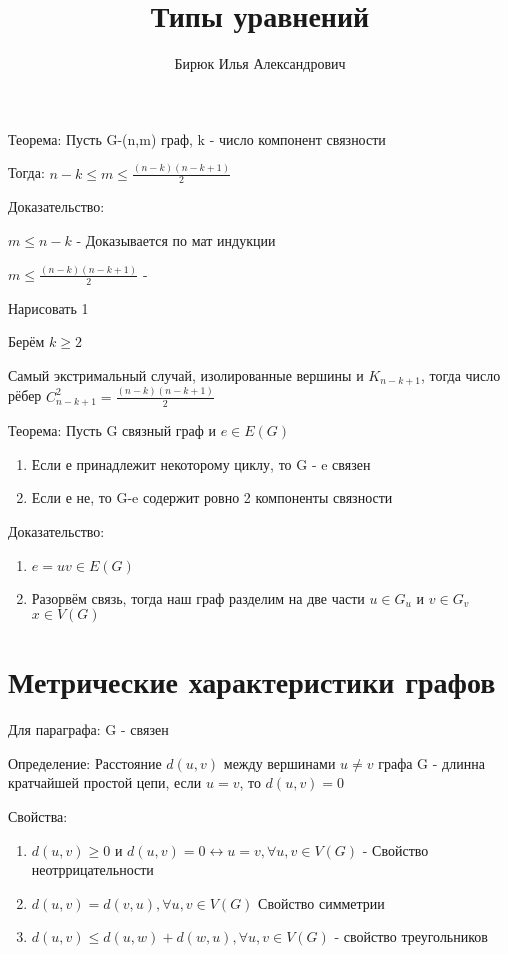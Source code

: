 \documentclass{article}
\title{Типы уравнений}
\author{Бирюк Илья Александрович}
\begin{document}
\maketitle
\newpage
\tableofcontents
\newpage
\section{}
Теорема: Пусть G-(n,m) граф, k - число компонент связности

Тогда: $n-k\leq{m}\leq\frac{(n-k)(n-k+1)}{2}$

Доказательство:

$m\leq{n-k}$ - Доказывается по мат индукции

$m\leq\frac{(n-k)(n-k+1)}{2}$ - 

Нарисовать 1

Берём $k\geq{2}$



Самый экстримальный случай, изолированные вершины и $K_{n-k+1}$, тогда число рёбер $C^2_{n-k+1}=\frac{(n-k)(n-k+1)}{2}$ 

Теорема: Пусть G связный граф и $e\in E(G)$

\begin{enumerate}
    \item Если е принадлежит некоторому циклу, то G - e связен
    \item Если е не, то G-e содержит ровно 2 компоненты связности
\end{enumerate}
Доказательство:
\begin{enumerate}
    \item $e=uv\in E(G)$
    \item Разорвём связь, тогда наш граф разделим на две части $u\in G_u$ и $v\in G_v$$x\in V(G)$
\end{enumerate}
\section{Метрические характеристики графов}
Для параграфа: G - связен

Определение: Расстояние $d(u,v)$ между вершинами $u\neq v$ графа G - длинна кратчайшей простой цепи, если $u=v$, то $d(u,v)=0$

Свойства:
\begin{enumerate}
    \item $d(u,v)\geq 0$ и $d(u,v) = 0 \leftrightarrow u=v, \forall u,v\in V(G)$ - Свойство неотррицательности
    \item $d(u,v)=d(v,u), \forall u,v\in V(G)$ Свойство симметрии
    \item $d(u,v)\leq d(u,w)+d(w,u), \forall u,v\in V(G)$ - свойство треугольников
\end{enumerate}
\end{document}

